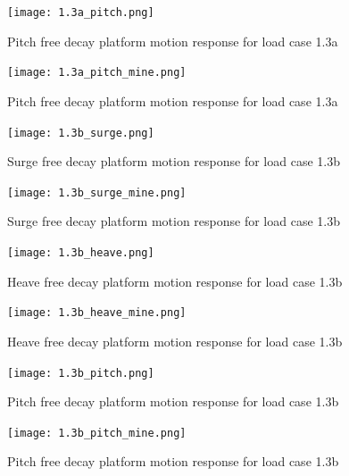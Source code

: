 \documentclass[a4paper, 11pt]{article}
\begin{document}
\begin{figure}[H]
    \begin{minipage}{0.48\textwidth}
        \centering
        \texttt{[image: 1.3a\_pitch.png]}
        \caption{\small Pitch free decay platform motion response for load case 1.3a \cite{Robertson2014}}
        \label{fig:1.3a_pitch}
    \end{minipage}
    \hfill
    \begin{minipage}{0.49\textwidth}
        \centering
        \texttt{[image: 1.3a\_pitch\_mine.png]}
        \caption{\small Pitch free decay platform motion response for load case 1.3a}
        \label{fig:1.3a_pitch_mine}
    \end{minipage}
\end{figure}

\begin{figure}[H]
    \begin{minipage}{0.47\textwidth}
        \centering
        \texttt{[image: 1.3b\_surge.png]}
        \caption{\small Surge free decay platform motion response for load case 1.3b \cite{Robertson2014}}
        \label{fig:1.3b_surge}
    \end{minipage}
    \hfill
    \begin{minipage}{0.5\textwidth}
        \centering
        \texttt{[image: 1.3b\_surge\_mine.png]}
        \caption{\small Surge free decay platform motion response for load case 1.3b}
        \label{fig:1.3b_surge_mine}
    \end{minipage}
\end{figure}

\begin{figure}[H]
    \begin{minipage}{0.47\textwidth}
        \centering
        \texttt{[image: 1.3b\_heave.png]}
        \caption{\small Heave free decay platform motion response for load case 1.3b \cite{Robertson2014}}
        \label{fig:1.3b_heave}
    \end{minipage}
    \hfill
    \begin{minipage}{0.5\textwidth}
        \centering
        \texttt{[image: 1.3b\_heave\_mine.png]}
        \caption{\small Heave free decay platform motion response for load case 1.3b}
        \label{fig:1.3b_heave_mine}
    \end{minipage}
\end{figure}

\begin{figure}[H]
    \begin{minipage}{0.47\textwidth}
        \centering
        \texttt{[image: 1.3b\_pitch.png]}
        \caption{\small Pitch free decay platform motion response for load case 1.3b \cite{Robertson2014}}
        \label{fig:1.3b_pitch}
    \end{minipage}
    \hfill
    \begin{minipage}{0.5\textwidth}
        \centering
        \vspace{-0.3cm}
        \texttt{[image: 1.3b\_pitch\_mine.png]}
        \caption{\small Pitch free decay platform motion response for load case 1.3b}
        \label{fig:1.3b_pitch_mine}
    \end{minipage}
\end{figure}
\end{document}
